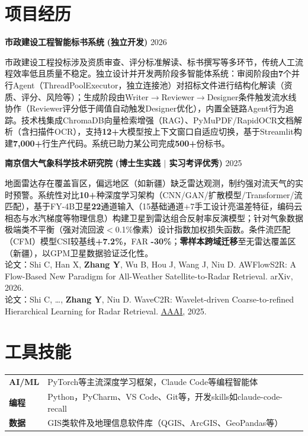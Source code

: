 \documentclass[10pt,a4paper]{article}
\let\oldhref\href
\renewcommand{\href}[2]{\oldhref{#1}{\underline{#2}}}
\newcommand{\project}[3]{%
  \vspace{1pt}
  {\textbf{#1}} {\textbf{(#3)}} \hfill {\color{lightgray}#2}\par\vspace{0pt}
}
\begin{document}
\section{项目经历}
\project{市政建设工程智能标书系统}{2026}
{独立开发}

市政建设工程投标涉及资质审查、评分标准解读、标书撰写等多环节，传统人工流程效率低且质量不稳定。独立设计并开发两阶段多智能体系统：审阅阶段由\textbf{7}个并行Agent（ThreadPoolExecutor，独立连接池）对招标文件进行结构化解读（资质、评分、风险等）；生成阶段由Writer$\to$Reviewer$\to$Designer条件触发流水线协作（Reviewer评分低于阈值自动触发Designer优化），内置全链路Agent行为追踪。技术栈集成ChromaDB向量检索增强（RAG）、PyMuPDF/RapidOCR文档解析（含扫描件OCR），支持\textbf{12+}大模型按上下文窗口自适应切换，基于Streamlit构建\textbf{7,000+}行生产代码。系统已助力某公司完成\textbf{500+}份标书。\par

\vspace{12pt}
\project{南京信大气象科学技术研究院}{2025}
{博士生实践 $|$ 实习考评优秀}

地面雷达存在覆盖盲区，偏远地区（如新疆）缺乏雷达观测，制约强对流天气的实时预警。系统性对比\textbf{10+}种深度学习架构（CNN/GAN/扩散模型/Transformer/流匹配），基于FY-4B卫星\textbf{22}通道输入（15基础通道+7手工设计亮温差特征，编码云相态与水汽梯度等物理信息）构建卫星到雷达组合反射率反演模型；针对气象数据极端类不平衡（强对流回波$<$0.1\%像素）设计指数加权损失函数。条件流匹配（CFM）模型CSI较基线\textbf{+7.2\%}，FAR \textbf{-30\%}；\textbf{零样本跨域迁移}至无雷达覆盖区（新疆），以GPM卫星数据验证泛化性。\\[2pt]
{论文：Shi C, Han X, \textbf{Zhang Y}, Wu B, Hou J, Wang J, Niu D. AWFlowS2R: A Flow-Based New Paradigm for All-Weather Satellite-to-Radar Retrieval. arXiv, 2026.\\
论文：Shi C, \ldots, \textbf{Zhang Y}, Niu D. WaveC2R: Wavelet-driven Coarse-to-refined Hierarchical Learning for Radar Retrieval. \href{https://arxiv.org/abs/2511.17558}{AAAI}, 2025.}\par


\section{工具技能}

\begin{tabularx}{\textwidth}{@{}lX@{}}
\textbf{AI/ML} & PyTorch等主流深度学习框架，Claude Code等编程智能体 \\
\textbf{编程} & Python，PyCharm、VS Code、Git等，开发skills如claude-code-recall \\
\textbf{数据} & GIS类软件及地理信息软件库（QGIS、ArcGIS、GeoPandas等） \\
\end{tabularx}
\end{document}
